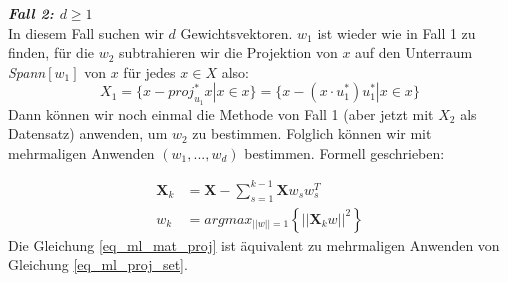 \textbf{\textit{Fall 2: $d \geq 1$}}\\

In diesem Fall suchen wir $d$ Gewichtsvektoren. $w_1$ ist wieder wie in Fall 1 zu finden, für die $w_2$ subtrahieren wir die Projektion von $x$ auf den Unterraum \textit{Spann}{$[w_1]$} von $x$ für jedes $x \in X $ also:
\begin{equation}
    X_1 = \{x - proj_{u_1}^* x | x \in x\} = \{x - (x \cdot u_1^*)u_1^* | x \in x\}
    \label{eq_ml_proj_set}
\end{equation}
Dann können wir noch einmal die Methode von Fall 1 (aber jetzt mit $X_2$ als Datensatz) anwenden, um $w_2$ zu bestimmen. Folglich können wir mit mehrmaligen Anwenden $(w_1,...,w_d)$ bestimmen. Formell geschrieben:

\begin{align}
    \textbf{X}_k &= \textbf{X} - \sum_{s=1}^{k-1} \textbf{X}w_s w_s^T\\ \label{eq_ml_mat_proj}
    w_k &=  argmax_{||w|| = 1} \left\{||\textbf{X}_k w||^2\right\}
\end{align}
Die Gleichung \ref{eq_ml_mat_proj} ist äquivalent zu mehrmaligen Anwenden von Gleichung \ref{eq_ml_proj_set}.
